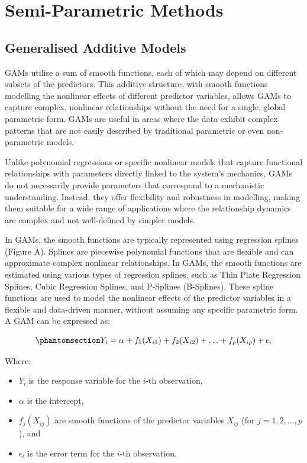 \documentclass[
  letterpaper,
]{book}
\providecommand{\tightlist}{%
  \setlength{\itemsep}{0pt}\setlength{\parskip}{0pt}}\usepackage{longtable,booktabs,array}
\begin{document}
\part{Semi-Parametric Methods}

\chapter{Generalised Additive
Models}\label{sec-generalised-additive-models}

GAMs utilise a sum of smooth functions, each of which may depend on
different subsets of the predictors. This additive structure, with
smooth functions modelling the nonlinear effects of different predictor
variables, allows GAMs to capture complex, nonlinear relationships
without the need for a single, global parametric form. GAMs are useful
in areas where the data exhibit complex patterns that are not easily
described by traditional parametric or even non-parametric models.

Unlike polynomial regressions or specific nonlinear models that capture
functional relationships with parameters directly linked to the system's
mechanics, GAMs do not necessarily provide parameters that correspond to
a mechanistic understanding. Instead, they offer flexibility and
robustness in modelling, making them suitable for a wide range of
applications where the relationship dynamics are complex and not
well-defined by simpler models.

In GAMs, the smooth functions are typically represented using regression
splines (Figure A). Splines are piecewise polynomial functions that are
flexible and can approximate complex nonlinear relationships. In GAMs,
the smooth functions are estimated using various types of regression
splines, such as Thin Plate Regression Splines, Cubic Regression
Splines, and P-Splines (B-Splines). These spline functions are used to
model the nonlinear effects of the predictor variables in a flexible and
data-driven manner, without assuming any specific parametric form. A GAM
can be expressed as:

\begin{equation}\phantomsection\label{eq-gam}{Y_i = \alpha + f_1(X_{i1}) + f_2(X_{i2}) + \ldots + f_p(X_{ip}) + \epsilon_i}\end{equation}

Where:

\begin{itemize}
\tightlist
\item
  \(Y_i\) is the response variable for the \(i\)-th observation,
\item
  \(\alpha\) is the intercept,
\item
  \(f_j(X_{ij})\) are smooth functions of the predictor variables
  \(X_{ij}\) (for \(j = 1, 2, \ldots, p\)), and
\item
  \(\epsilon_i\) is the error term for the \(i\)-th observation.
\end{itemize}
\end{document}
